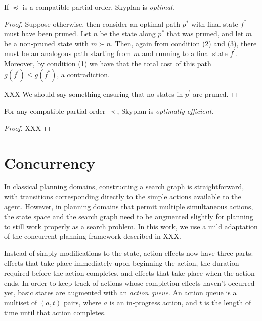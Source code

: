 \documentclass[letterpaper]{article}
\theoremstyle{plain} \newtheorem{theorem}{Theorem} \newtheorem{proposition}{Proposition} \newtheorem{lemma}{Lemma}
\theoremstyle{definition} \newtheorem{definition}{Definition} \newtheorem{conjecture}{Conjecture} \newtheorem*{example}{Example}
\theoremstyle{remark} \newtheorem*{remark}{Remark} \newtheorem*{note}{Note} \newtheorem{case}{Case}
\begin{document}
\begin{claim}{}\label{clm-optimal}
   If $\preceq$ is a compatible partial order, Skyplan
is \emph{optimal}.
\end{claim}
\begin{proof} Suppose otherwise, then consider an optimal path $p^*$ with final state $f^*$
  must have been pruned. Let $n$ be the state along $p^*$ that
  was pruned, and let $m$ be a non-pruned state with $m \succ n$.
  Then, again from condition (2) and (3), there must be an analogous path
  starting from $m$ and running to a final state $f^\prime$. Moreover, by condition (1)
  we have that the total cost of this path $g(f^\prime) \le g(f^*)$, a contradiction.

  XXX We should say something ensuring that no states in $p^\prime$ are pruned.
\end{proof}



\begin{claim}{}\label{clm-optimally-efficient}
For any compatible partial order $\prec$, Skyplan is \emph{optimally efficient}.
\end{claim}
\begin{proof} XXX \end{proof}
	

\section{Concurrency}

In classical planning domains, constructing a search graph is straightforward, with
transitions corresponding directly to the simple actions available to the agent. However,
in planning domains that permit multiple simultaneous actions, the state space and the
search graph need to be augmented slightly for planning to still work properly as a search
problem. In this work, we use a mild adaptation of the concurrent planning framework described in XXX.

Instead of simply modifications to the state, action effects now have three parts: effects
that take place immediately upon beginning the action, the duration required before the
action completes, and effects that take place when the action ends. In order to keep track
of actions whose completion effects haven't occurred yet, basic states are augmented with
an \emph{action queue}. An action queue is a multiset of $(a, t)$ pairs, where $a$ is an
in-progress action, and $t$ is the length of time until that action completes.
\end{document}

